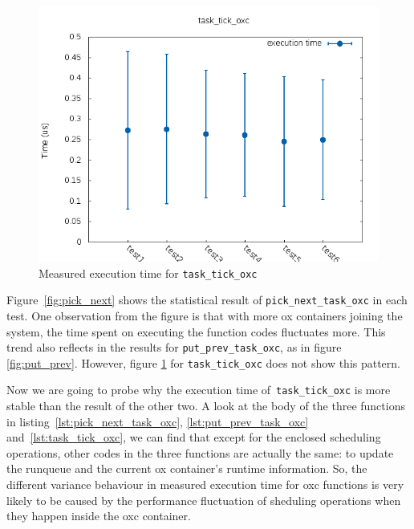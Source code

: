 \begin{figure}[H]%
        \centering
        \includegraphics[width=\textwidth, totalheight=0.4\textheight]{images/task_tick_oxc}
        \caption{Measured execution time for \texttt{task\_tick\_oxc}}
        \label{fig:task_tick}
\end{figure}

Figure~\ref{fig:pick_next} shows the statistical result of 
\texttt{pick\_next\_task\_oxc} in each test. One observation from the figure
is that with more ox containers joining the system, the time spent on executing
the function codes fluctuates more. This trend also reflects in the
results for \texttt{put\_prev\_task\_oxc}, as in figure \ref{fig:put_prev}.
However, figure \ref{fig:task_tick} for \texttt{task\_tick\_oxc} does not 
show this pattern.

Now we are going to probe why the execution time of~\texttt{task\_tick\_oxc}
is more stable than the result of the other two. A look at the body of the
three functions in listing~\ref{lst:pick_next_task_oxc}, 
\ref{lst:put_prev_task_oxc} and~\ref{lst:task_tick_oxc}, we can find that 
except for the enclosed scheduling
operations, other codes in the three functions are actually the same:
to update the runqueue and the current ox container's runtime information. 
So, the different variance behaviour in measured execution time for oxc 
functions is very likely to be caused by the performance fluctuation of 
sheduling operations when they happen inside the oxc container. 

